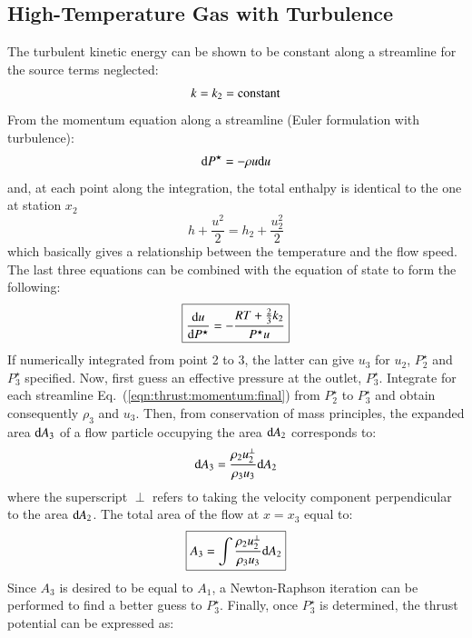 \documentclass{warpdoc}
\numberwithin{equation}{section}
\newcommand{\mfd}{\displaystyle}
\newcommand{\ordi}{{\rm d}}
\newcommand\frameeqn[1]{\fbox{$#1$}}
\begin{document}
\subsection{High-Temperature Gas with Turbulence}

The turbulent kinetic energy can be shown to be constant along a streamline
for the source terms neglected:
%
\begin{equation}
  k=k_2={\rm constant}
\end{equation}
%
From the momentum equation along a streamline (Euler formulation
with turbulence):
%
\begin{equation}
  \ordi P^\star = - \rho u \ordi u
\end{equation}
%
and, at each point along the integration, the total enthalpy is identical
to the one at station $x_2$
%
\begin{equation}
  h + \frac{u^2}{2} =  h_2 + \frac{u_2^2}{2}
\end{equation}
%
which basically gives a relationship between the temperature and the flow speed.
The last three equations can be combined with the equation of
state to form the following:
%
\begin{equation}
 \frameeqn{
  \mfd\frac{\ordi u}{\ordi P^\star} = - \frac{RT + \frac{2}{3}k_2}{P^\star u}
 }
  \label{eqn:thrust:momentum:final}
\end{equation}
%
If numerically integrated from point 2 to 3, 
the latter can give $u_3$ for $u_2$, $P^\star_2$ and $P^\star_3$ specified.
Now, first guess an effective pressure at the outlet, $P_3^\star$.
Integrate for each streamline
Eq.~(\ref{eqn:thrust:momentum:final}) from $P_2^\star$ to $P_3^\star$ and obtain consequently
$\rho_3$ and $u_3$.  Then, from conservation of mass principles,
the expanded area $\ordi A_3$ of a flow particle occupying the
area $\ordi A_2$ corresponds to:
%
\begin{equation}
   \ordi A_3  = \frac{\rho_2 u_2^\perp}{\rho_3 u_3} \ordi A_2
\end{equation}
%
where the superscript $\perp$ refers to taking the velocity component
perpendicular to the area $\ordi A_2$. 
The total area of the flow at $x=x_3$ equal to:
%
\begin{equation}
  \frameeqn{
    \mfd A_3= \int \frac{\rho_2 u_2^\perp}{\rho_3 u_3} \ordi A_2
  }
\end{equation}
%
Since $A_3$ is desired to be equal to $A_1$, a Newton-Raphson iteration
can be performed to find a better guess to $P_3^\star$. Finally, once
$P_3^\star$ is determined, the thrust potential can be expressed as:
\end{document}
